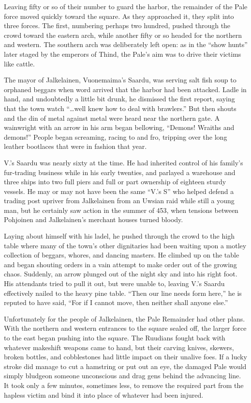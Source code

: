 \documentclass[12pt]{report}
\begin{document}
Leaving fifty or so of their number to guard the harbor, the remainder
of the Pale force moved quickly toward the square.  As they approached
it, they split into three forces.  The first, numbering perhaps two
hundred, pushed through the crowd toward the eastern arch, while
another fifty or so headed for the northern and western.  The southern
arch was deliberately left open: as in the ``show hunts'' later staged
by the emperors of Thind, the Pale's aim was to drive their victims
like cattle.

The mayor of Jalkelainen, Vuonemaima's Saardu, was serving salt fish
soup to orphaned beggars when word arrived that the harbor had been
attacked.  Ladle in hand, and undoubtedly a little bit drunk, he
dismissed the first report, saying that the town watch ``{\ldots}well
knew how to deal with brawlers.''  But then shouts and the din of metal
against metal were heard near the northern gate.  A wainwright with an
arrow in his arm began bellowing, ``Demons! Wraiths and demons!''
People began screaming, racing to and fro, tripping over the long
leather bootlaces that were in fashion that year.

V.'s Saardu was nearly sixty at the time.  He had inherited control of
his family's fur-trading business while in his early twenties, and
parlayed a warehouse and three ships into two full piers and full or
part ownership of eighteen sturdy vessels.  He may or may not have
been the same ``V.'s S'' who helped defend a trading post upriver from
Jalkelainen from an Uwsian raid while still a young man, but he
certainly saw action in the summer of 453, when tensions between
Pohjoinen and Jalkelainen's merchant houses turned bloody.

Laying about himself with his ladel, he pushed through the crowd to
the high table where many of the town's other dignitaries had been
waiting upon a motley collection of beggars, whores, and dancing
masters.  He climbed up on the table and began shouting orders in a
vain attempt to make order out of the growing chaos.  Suddenly, an
arrow plunged out of the night sky and into his right foot.  His
attendants tried to pull it out, but were unable to, leaving V.'s
Saardu effectively nailed to the heavy pine table.  ``Then our line
needs form here,'' he is reputed to have said, ``For if I cannot move,
then neither shall anyone else.''

Unfortunately for the people of Jalkelainen, the Pale Remainder had
other plans.  With the northern and western entrances to the square
sealed off, the larger force to the east began pushing into the
square.  The Ruudians fought back with whatever makeshift weapons came
to hand, but their carving knives, skewers, broken bottles, and
cobblestones had little impact on their unalive foes.  If a lucky
stroke did manage to cut a hamstring or put out an eye, the damaged
Pale would simply bludgeon someone unconscious and drag gens behind
the advancing line.  It took only a few minutes, sometimes less, to
remove the required part from the hapless victim and bind it into
place of whatever had been injured.
\end{document}
